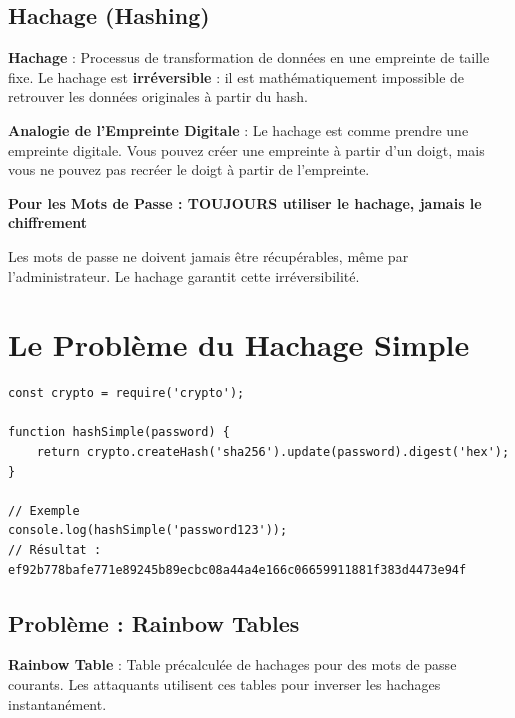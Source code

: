 \subsection{Hachage (Hashing)}

\begin{definitionbox}
    \textbf{Hachage} : Processus de transformation de données en une empreinte de taille fixe. Le hachage est \textbf{irréversible} : il est mathématiquement impossible de retrouver les données originales à partir du hash.
\end{definitionbox}

\begin{analogybox}
    \textbf{Analogie de l'Empreinte Digitale} : Le hachage est comme prendre une empreinte digitale. Vous pouvez créer une empreinte à partir d'un doigt, mais vous ne pouvez pas recréer le doigt à partir de l'empreinte.
\end{analogybox}

\begin{bestpracticebox}
    \textbf{Pour les Mots de Passe : TOUJOURS utiliser le hachage, jamais le chiffrement}
    
    Les mots de passe ne doivent jamais être récupérables, même par l'administrateur. Le hachage garantit cette irréversibilité.
\end{bestpracticebox}

\section{Le Problème du Hachage Simple}

\begin{lstlisting}[style=javascript, caption=Hachage simple (DÉCONSEILLÉ)]
const crypto = require('crypto');

function hashSimple(password) {
    return crypto.createHash('sha256').update(password).digest('hex');
}

// Exemple
console.log(hashSimple('password123'));
// Résultat : ef92b778bafe771e89245b89ecbc08a44a4e166c06659911881f383d4473e94f
\end{lstlisting}

\subsection{Problème : Rainbow Tables}

\begin{definitionbox}
    \textbf{Rainbow Table} : Table précalculée de hachages pour des mots de passe courants. Les attaquants utilisent ces tables pour inverser les hachages instantanément.
\end{definitionbox}

